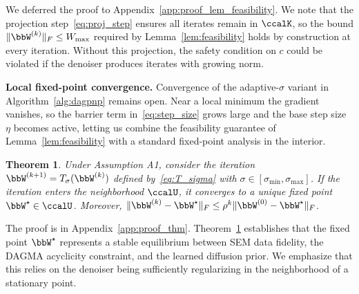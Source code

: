 \documentclass[conference]{IEEEtran}
\newtheorem{theorem}{\bf Theorem}
\begin{document}
	We deferred the proof to Appendix~\ref{app:proof_lem_feasibility}. 
    We note that the projection step~\eqref{eq:proj_step} ensures all iterates remain in $\ccalK$, so the bound $\|\bbW^{(k)}\|_F \leq W_{\max}$ required by Lemma~\ref{lem:feasibility} holds by construction at every iteration. Without this projection, the safety condition on $c$ could be violated if the denoiser produces iterates with growing norm.
	
	\vspace{1mm}
	\noindent\textbf{Local fixed-point convergence.}
	Convergence of the adaptive-$\sigma$ variant in Algorithm~\ref{alg:dagpnp} remains open. Near a local minimum the gradient vanishes, so the barrier term in~\eqref{eq:step_size} grows large and the base step size $\eta$ becomes active, letting us combine the feasibility guarantee of Lemma~\ref{lem:feasibility} with a standard fixed-point analysis in the interior.

	\begin{theorem}\label{thm:convergence}
		Under Assumption A1, consider the iteration $\bbW^{(k+1)} = T_\sigma(\bbW^{(k)})$ defined by~\eqref{eq:T_sigma} with $\sigma \in [\sigma_{\min}, \sigma_{\max}]$. If the iteration enters the neighborhood $\ccalU$, it converges to a unique fixed point $\bbW^\star \in \ccalU$. Moreover, $\|\bbW^{(k)} - \bbW^\star\|_F \leq \rho^k \|\bbW^{(0)} - \bbW^\star\|_F$.
	\end{theorem}

    The proof is in Appendix~\ref{app:proof_thm}.
	Theorem~\ref{thm:convergence} establishes that the fixed point $\bbW^\star$ represents a stable equilibrium between SEM data fidelity, the DAGMA acyclicity constraint, and the learned diffusion prior. We emphasize that this relies on the denoiser being sufficiently regularizing in the neighborhood of a stationary point.
	
\end{document}
